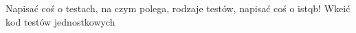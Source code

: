 Napisać coś o  testach, na czym polega, rodzaje testów, 
napisać coś o istqb!
Wkeić kod testów jednostkowych 